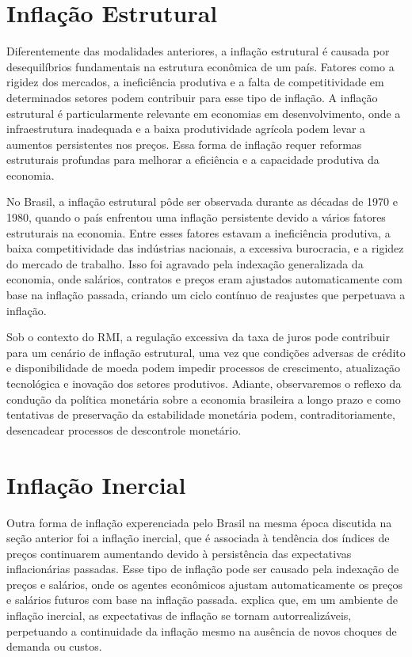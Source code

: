 \documentclass[12pt,oneside,a4paper,chapter=TITLE,english,brazil,sumario=abnt-6027-2012]{abntex2}
\begin{document}
\section{Inflação Estrutural}

Diferentemente das modalidades anteriores, a inflação estrutural é causada por desequilíbrios fundamentais na estrutura econômica de um país. Fatores como a rigidez dos mercados, a ineficiência produtiva e a falta de competitividade em determinados setores podem contribuir para esse tipo de inflação. A inflação estrutural é particularmente relevante em economias em desenvolvimento, onde a infraestrutura inadequada e a baixa produtividade agrícola podem levar a aumentos persistentes nos preços. Essa forma de inflação requer reformas estruturais profundas para melhorar a eficiência e a capacidade produtiva da economia.

No Brasil, a inflação estrutural pôde ser observada durante as décadas de 1970 e 1980, quando o país enfrentou uma inflação persistente devido a vários fatores estruturais na economia. Entre esses fatores estavam a ineficiência produtiva, a baixa competitividade das indústrias nacionais, a excessiva burocracia, e a rigidez do mercado de trabalho. Isso foi agravado pela indexação generalizada da economia, onde salários, contratos e preços eram ajustados automaticamente com base na inflação passada, criando um ciclo contínuo de reajustes que perpetuava a inflação.

Sob o contexto do RMI, a regulação excessiva da taxa de juros pode contribuir para um cenário de inflação estrutural, uma vez que condições adversas de crédito e disponibilidade de moeda podem impedir processos de crescimento, atualização tecnológica e inovação dos setores produtivos. Adiante, observaremos o reflexo da condução da política monetária sobre a economia brasileira a longo prazo e como tentativas de preservação da estabilidade monetária podem, contraditoriamente, desencadear processos de descontrole monetário.

\section{Inflação Inercial}

Outra forma de inflação experenciada pelo Brasil na mesma época discutida na seção anterior foi a inflação inercial, que é associada à tendência dos índices de preços continuarem aumentando devido à persistência das expectativas inflacionárias passadas. Esse tipo de inflação pode ser causado pela indexação de preços e salários, onde os agentes econômicos ajustam automaticamente os preços e salários futuros com base na inflação passada.  explica que, em um ambiente de inflação inercial, as expectativas de inflação se tornam autorrealizáveis, perpetuando a continuidade da inflação mesmo na ausência de novos choques de demanda ou custos.
\end{document}
